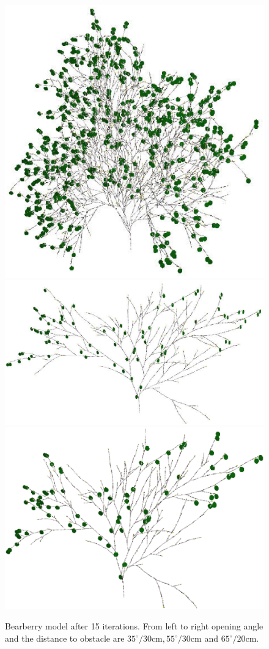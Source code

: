 \begin{figure}
\includegraphics[scale=0.2]{a-uvaursi-15-35-30}
\includegraphics[scale=0.2]{a-uvaursi-15-55-30}
\includegraphics[scale=0.2]{a-uvaursi-15-65-30}    
\caption{Bearberry model after 15 iterations. From left to right 
  opening angle and the distance to obstacle are $35^{\circ}/30\mathrm{cm}, 
 55^{\circ}/30\mathrm{cm}$ and $65^{\circ}/20\mathrm{cm}$.}\label{fig:a-uva-ursi} 
\end{figure}
